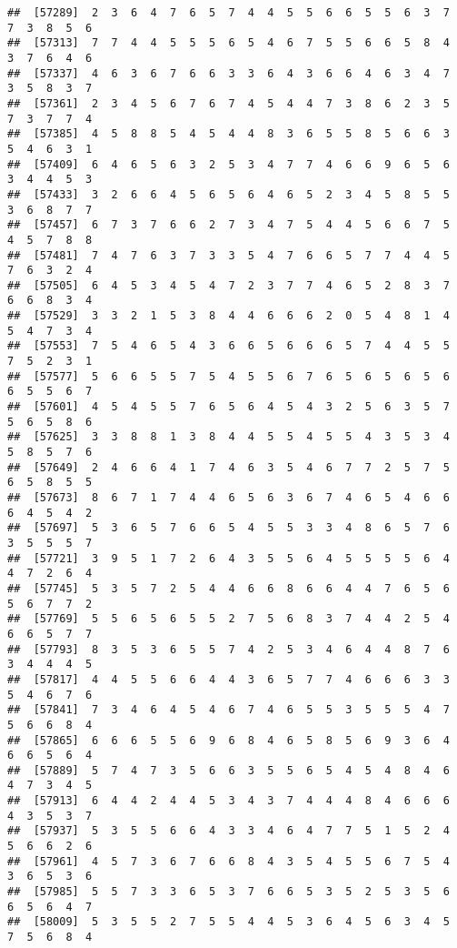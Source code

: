 \documentclass[
]{book}
\begin{document}
\begin{verbatim}
##  [57289]  2  3  6  4  7  6  5  7  4  4  5  5  6  6  5  5  6  3  7  7  3  8  5  6
##  [57313]  7  7  4  4  5  5  5  6  5  4  6  7  5  5  6  6  5  8  4  3  7  6  4  6
##  [57337]  4  6  3  6  7  6  6  3  3  6  4  3  6  6  4  6  3  4  7  3  5  8  3  7
##  [57361]  2  3  4  5  6  7  6  7  4  5  4  4  7  3  8  6  2  3  5  7  3  7  7  4
##  [57385]  4  5  8  8  5  4  5  4  4  8  3  6  5  5  8  5  6  6  3  5  4  6  3  1
##  [57409]  6  4  6  5  6  3  2  5  3  4  7  7  4  6  6  9  6  5  6  3  4  4  5  3
##  [57433]  3  2  6  6  4  5  6  5  6  4  6  5  2  3  4  5  8  5  5  3  6  8  7  7
##  [57457]  6  7  3  7  6  6  2  7  3  4  7  5  4  4  5  6  6  7  5  4  5  7  8  8
##  [57481]  7  4  7  6  3  7  3  3  5  4  7  6  6  5  7  7  4  4  5  7  6  3  2  4
##  [57505]  6  4  5  3  4  5  4  7  2  3  7  7  4  6  5  2  8  3  7  6  6  8  3  4
##  [57529]  3  3  2  1  5  3  8  4  4  6  6  6  2  0  5  4  8  1  4  5  4  7  3  4
##  [57553]  7  5  4  6  5  4  3  6  6  5  6  6  6  5  7  4  4  5  5  7  5  2  3  1
##  [57577]  5  6  6  5  5  7  5  4  5  5  6  7  6  5  6  5  6  5  6  6  5  5  6  7
##  [57601]  4  5  4  5  5  7  6  5  6  4  5  4  3  2  5  6  3  5  7  5  6  5  8  6
##  [57625]  3  3  8  8  1  3  8  4  4  5  5  4  5  5  4  3  5  3  4  5  8  5  7  6
##  [57649]  2  4  6  6  4  1  7  4  6  3  5  4  6  7  7  2  5  7  5  6  5  8  5  5
##  [57673]  8  6  7  1  7  4  4  6  5  6  3  6  7  4  6  5  4  6  6  6  4  5  4  2
##  [57697]  5  3  6  5  7  6  6  5  4  5  5  3  3  4  8  6  5  7  6  3  5  5  5  7
##  [57721]  3  9  5  1  7  2  6  4  3  5  5  6  4  5  5  5  5  6  4  4  7  2  6  4
##  [57745]  5  3  5  7  2  5  4  4  6  6  8  6  6  4  4  7  6  5  6  5  6  7  7  2
##  [57769]  5  5  6  5  6  5  5  2  7  5  6  8  3  7  4  4  2  5  4  6  6  5  7  7
##  [57793]  8  3  5  3  6  5  5  7  4  2  5  3  4  6  4  4  8  7  6  3  4  4  4  5
##  [57817]  4  4  5  5  6  6  4  4  3  6  5  7  7  4  6  6  6  3  3  5  4  6  7  6
##  [57841]  7  3  4  6  4  5  4  6  7  4  6  5  5  3  5  5  5  4  7  5  6  6  8  4
##  [57865]  6  6  6  5  5  6  9  6  8  4  6  5  8  5  6  9  3  6  4  6  6  5  6  4
##  [57889]  5  7  4  7  3  5  6  6  3  5  5  6  5  4  5  4  8  4  6  4  7  3  4  5
##  [57913]  6  4  4  2  4  4  5  3  4  3  7  4  4  4  8  4  6  6  6  4  3  5  3  7
##  [57937]  5  3  5  5  6  6  4  3  3  4  6  4  7  7  5  1  5  2  4  5  6  6  2  6
##  [57961]  4  5  7  3  6  7  6  6  8  4  3  5  4  5  5  6  7  5  4  3  6  5  3  6
##  [57985]  5  5  7  3  3  6  5  3  7  6  6  5  3  5  2  5  3  5  6  6  5  6  4  7
##  [58009]  5  3  5  5  2  7  5  5  4  4  5  3  6  4  5  6  3  4  5  7  5  6  8  4

\end{verbatim}
\end{document}
